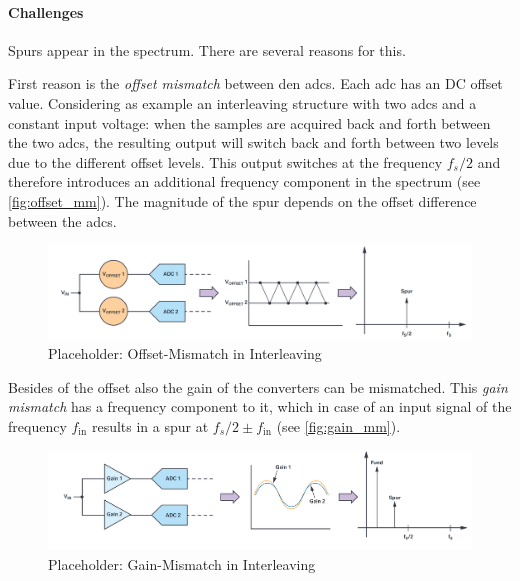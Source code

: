 \paragraph{Challenges}
Spurs appear in the spectrum. There are several reasons for this.

First reason is the \textit{offset mismatch} between den \glspl{adc}. Each \gls{adc} has an DC offset value. Considering as example an interleaving structure with two \glspl{adc} and a constant input voltage: when the samples are acquired back and forth between the two \glspl{adc}, the resulting output will switch back and forth between two levels due to the different offset levels. This output switches at the frequency $f_s/2$ and therefore introduces an additional frequency component in the spectrum (see \autoref{fig:offset_mm}). The magnitude of the spur depends on the offset difference between the \glspl{adc}. \cite{Harris2019}

\begin{figure}[tbh]
	\centering
	\includegraphics[width = \textwidth]{chap/02-theory/img/offset_mm}
	\caption{Placeholder: Offset-Mismatch in Interleaving \cite{Harris2019}}
	\label{fig:offset_mm}
\end{figure}

Besides of the offset also the gain of the converters can be mismatched. This \textit{gain mismatch} has a frequency component to it, which in case of an input signal of the frequency $f_{\text{in}}$ results in a spur at $f_s/2 \pm f_{\text{in}}$ (see \autoref{fig:gain_mm}). \cite{Harris2019}

\begin{figure}[tbh]
	\centering
	\includegraphics[width = \textwidth]{chap/02-theory/img/gain_mm}
	\caption{Placeholder: Gain-Mismatch in Interleaving \cite{Harris2019}}
	\label{fig:gain_mm}
\end{figure}

